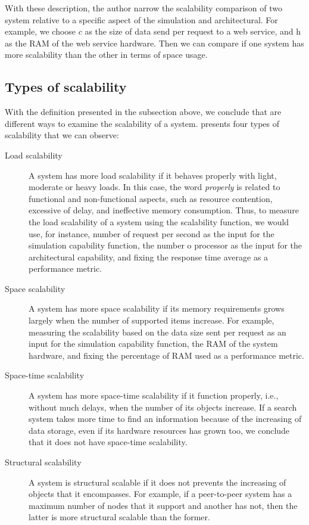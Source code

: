 With these description, the author narrow the scalability comparison of two system relative to a specific aspect of the simulation and architectural. For example, we choose $c$ as the size of data send per request to a web service, and h as the RAM of the web service hardware. Then we can compare if one system has more scalability than the other in terms of space usage. 

\subsection{Types of scalability}
With the definition presented in the subsection above, we conclude that are different ways to examine the scalability of a system. \cite{BONDI} presents four types of scalability that we can observe:

\begin{description}
\item[Load scalability] A system has more load scalability if it behaves properly with light, moderate or heavy loads. In this case, the word \emph{properly} is related to functional and non-functional aspects, such as resource contention, excessive of delay, and ineffective memory consumption. Thus, to measure the load scalability of a system using the scalability function, we would use, for instance,  number of request per second as the input for the simulation capability function, the number o processor as the input for the architectural capability, and fixing the response time average as a performance metric.
\item[Space scalability]  A system has more space scalability if its memory requirements grows largely when the number of supported items increase. For example, measuring the scalability based on the data size sent per request as an input for the simulation capability function, the RAM of the system hardware, and fixing the percentage of RAM used as a performance metric.
\item[Space-time scalability] A system has more space-time scalability if it function properly, i.e., without much delays, when the number of its objects increase. If a search system takes more time to find an information because of the increasing of data storage, even if its hardware resources has grown too, we conclude that it does not have space-time scalability.
\item[Structural scalability] A system is structural scalable if it does not prevents the increasing of objects that it encompasses. For example, if a peer-to-peer system has a maximum number of nodes that it support and another has not, then the latter is more structural scalable than the former.
\end{description}

